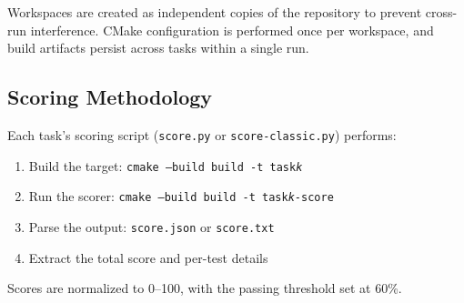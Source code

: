 Workspaces are created as independent copies of the \yatcc{} repository to prevent cross-run interference.
CMake configuration is performed once per workspace, and build artifacts persist across tasks within a single run.

\subsection{Scoring Methodology}

Each task's scoring script (\texttt{score.py} or \texttt{score-classic.py}) performs:
\begin{enumerate}[nosep]
\item Build the target: \texttt{cmake --build build -t task\textit{k}}
\item Run the scorer: \texttt{cmake --build build -t task\textit{k}-score}
\item Parse the output: \texttt{score.json} or \texttt{score.txt}
\item Extract the total score and per-test details
\end{enumerate}

Scores are normalized to 0--100, with the passing threshold set at 60\%.